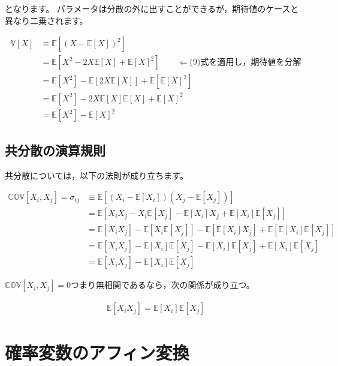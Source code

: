 \documentclass[
  letterpaper,
  pandoc,
  ja=standard,
  jafont = hiragino-pron]{ltjsbook}
\begin{document}
となります。
パラメータは分散の外に出すことができるが，期待値のケースと異なり二乗されます。

\[
\begin{aligned}
\mathbb{V}[X] &\equiv \mathbb{E} \left [ (X - \mathbb{E} [X])^2 \right ] \nonumber  \\
        &=\mathbb{E} \left [ X^2 - 2X\mathbb{E}[X] + \mathbb{E}[X]^2 \right ] \qquad \Leftarrow \text{(9)式を適用し，期待値を分解}\nonumber \\
        &=\mathbb{E} \left [ X^2 \right ] - \mathbb{E} \left [ 2 X \mathbb{E}[X] \right ] + \mathbb{E} \left [ \mathbb{E}[X]^2 \right ]\nonumber \\
        &=\mathbb{E} \left [ X^2 \right ] - 2 X \mathbb{E} [X] \mathbb{E}[X] + \mathbb{E} [X]^2\nonumber \\
        &=\mathbb{E} \left [ X^2 \right ] - \mathbb{E} [X]^2
\end{aligned}
\]

\subsection{共分散の演算規則}\label{ux5171ux5206ux6563ux306eux6f14ux7b97ux898fux5247}

共分散については，以下の法則が成り立ちます。

\[
\begin{aligned}
\mathbb{COV}[X_i,X_j] = \sigma _{ij} &\equiv \mathbb{E}  \left [(X_i - \mathbb{E}[X_i])(X_j - \mathbb{E}[X_j]) \right ] \nonumber \\
&= \mathbb{E}[X_i X_j - X_i \mathbb{E}[X_j] - \mathbb{E}[X_i]X_j + \mathbb{E}[X_i]\mathbb{E}[X_j]]\nonumber \\
&= \mathbb{E}[X_i X_j] - \mathbb{E}[X_i \mathbb{E}[X_j]] - \mathbb{E}[\mathbb{E}[X_i]X_j] + \mathbb{E}[\mathbb{E}[X_i]\mathbb{E}[X_j]]\nonumber  \\
&= \mathbb{E}[X_i X_j] - \mathbb{E}[X_i] \mathbb{E}[X_j] - \mathbb{E}[X_i]\mathbb{E}[X_j] + \mathbb{E}[X_i]\mathbb{E}[X_j] \nonumber \\
&= \mathbb{E}[X_i X_j] - \mathbb{E}[X_i] \mathbb{E}[X_j]
\end{aligned}
\]

\(\mathbb{COV}[X_i,X_j]=0\)つまり無相関であるなら，次の関係が成り立つ。

\[
\begin{aligned}
\mathbb{E}[X_iX_j] = \mathbb{E}[X_i]\mathbb{E}[X_j]
\end{aligned}
\]

\section{確率変数のアフィン変換}\label{ux78baux7387ux5909ux6570ux306eux30a2ux30d5ux30a3ux30f3ux5909ux63db}
\end{document}
